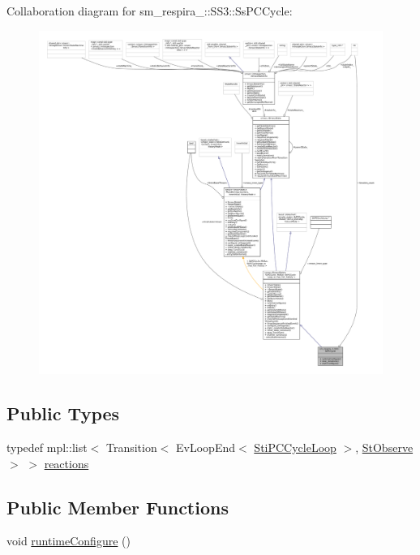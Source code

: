 Collaboration diagram for sm\+\_\+respira\+\_\+:\+:S\+S3\+:\+:Ss\+P\+C\+Cycle\+:
\nopagebreak
\begin{figure}[H]
\begin{center}
\leavevmode
\includegraphics[width=350pt]{structsm__respira__1_1_1SS3_1_1SsPCCycle__coll__graph}
\end{center}
\end{figure}
\subsection*{Public Types}
\begin{DoxyCompactItemize}
\item 
typedef mpl\+::list$<$ Transition$<$ Ev\+Loop\+End$<$ \hyperlink{structsm__respira__1_1_1pc__cycle__inner__states_1_1StiPCCycleLoop}{Sti\+P\+C\+Cycle\+Loop} $>$, \hyperlink{structsm__respira__1_1_1StObserve}{St\+Observe} $>$ $>$ \hyperlink{structsm__respira__1_1_1SS3_1_1SsPCCycle_a04b24f141aa6ad55e40be05fe81d9c8b}{reactions}
\end{DoxyCompactItemize}
\subsection*{Public Member Functions}
\begin{DoxyCompactItemize}
\item 
void \hyperlink{structsm__respira__1_1_1SS3_1_1SsPCCycle_a0ae942a0c3f81d9425772b8ef7ba68b3}{runtime\+Configure} ()
\end{DoxyCompactItemize}
